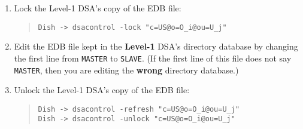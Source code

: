 \begin{enumerate}
\item	Lock the Level-1 DSA's copy of the EDB file:
\begin{quote}\small\begin{verbatim}
Dish -> dsacontrol -lock "c=US@o=O_i@ou=U_j"
\end{verbatim}\end{quote}

\item	Edit the EDB file kept in the {\bf Level-1\/} DSA's directory
database by changing the first line from \verb"MASTER" to \verb"SLAVE".
(If the first line of this file does not say \verb"MASTER",
then you are editing the {\bf wrong\/} directory database.)

\item	Unlock the Level-1 DSA's copy of the EDB file:
\begin{quote}\small\begin{verbatim}
Dish -> dsacontrol -refresh "c=US@o=O_i@ou=U_j"
Dish -> dsacontrol -unlock "c=US@o=O_i@ou=U_j"
\end{verbatim}\end{quote}
\end{enumerate}

